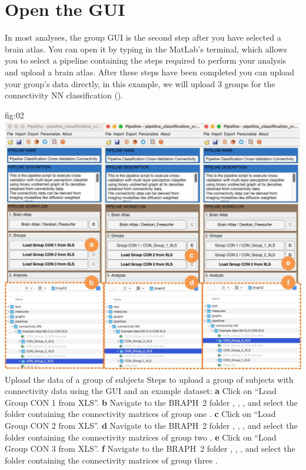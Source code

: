 \documentclass[justified]{tufte-handout}
\begin{document}
\section{Open the GUI}

In most analyses, the group GUI is the second step after you have selected a brain atlas. You can open it by typing  in the MatLab's terminal, which allows you to select a pipeline containing the steps required to perform your analysis and upload a brain atlas. After these steps have been completed you can upload your group's data directly, in this example, we will upload 3 groups for the connectivity NN classification (). 

	{fig:02}
	{
	\includegraphics{fig02.jpg}
	}
	{Upload the data of a group of subjects}
	{
	Steps to upload a group of subjects with connectivity data using the GUI and an example dataset: 
	{\bf a} Click on ``Load Group CON 1 from XLS''.
	{\bf b} Navigate to the BRAPH~2 folder , , , and select the folder containing the connectivity matrices of group one .
        {\bf c} Click on ``Load Group CON 2 from XLS''.
	{\bf d} Navigate to the BRAPH~2 folder , , , and select the folder containing the connectivity matrices of group two .
        {\bf e} Click on ``Load Group CON 3 from XLS''.
        {\bf f} Navigate to the BRAPH~2 folder , , , and select the folder containing the connectivity matrices of group three .
	}
\end{document}
